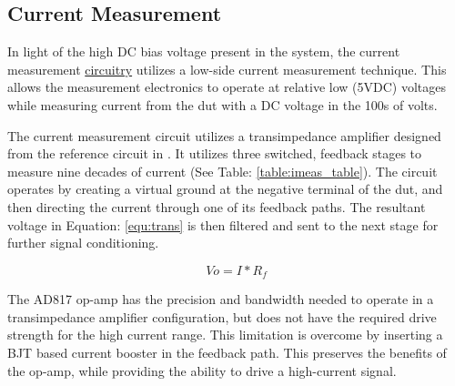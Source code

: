 \subsection{Current Measurement}
\label{sec:iMeas}

In light of the high DC bias voltage present in the system, the current measurement \hyperlink{sch:discharging}{circuitry} utilizes a low-side current measurement technique. This allows the measurement electronics to operate at relative low (5VDC) voltages while measuring current from the \gls{dut} with a DC voltage in the 100s of volts.



The current measurement circuit utilizes a transimpedance amplifier designed from the reference circuit in \cite{steve_thesis}. It utilizes three switched, feedback stages to measure nine decades of current (See Table: \ref{table:imeas_table}). The circuit operates by creating a virtual ground at the negative terminal of the \gls{dut}, and then directing the current through one of its feedback paths. The resultant voltage in Equation: \eqref{equ:trans} is then filtered and sent to the next stage for further signal conditioning.

\begin{equation}
\label{equ:trans}
Vo = I*R_f
\end{equation}

The AD817 op-amp has the precision and bandwidth needed to operate in a transimpedance amplifier configuration, but does not have the required drive strength for the  high current range. This limitation is overcome by inserting a BJT based current booster in the feedback path. This preserves the benefits of the op-amp, while providing the ability to drive a high-current signal.

